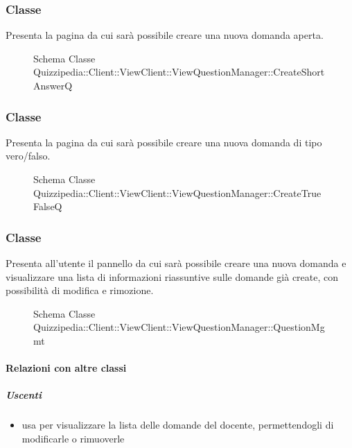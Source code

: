 \subsubsection{Classe }
Presenta la pagina da cui sarà possibile creare una nuova domanda aperta.
\begin{figure}[H]
\centering
\noindent{}
\caption[Schema Classe CreateShortAnswerQ]{Schema Classe Quizzipedia::Client::ViewClient::ViewQuestionManager::CreateShortAnswerQ}
\end{figure}
\subsubsection{Classe }
Presenta la pagina da cui sarà possibile creare una nuova domanda di tipo vero/falso.
\begin{figure}[H]
\centering
\noindent{}
\caption[Schema Classe CreateTrueFalseQ]{Schema Classe Quizzipedia::Client::ViewClient::ViewQuestionManager::CreateTrueFalseQ}
\end{figure}
\subsubsection{Classe }
Presenta all'utente il pannello da cui sarà possibile creare una nuova domanda e visualizzare una lista di informazioni riassuntive sulle domande già create, con possibilità di modifica e rimozione.
\begin{figure}[H]
\centering
\noindent{}
\caption[Schema Classe QuestionMgmt]{Schema Classe Quizzipedia::Client::ViewClient::ViewQuestionManager::QuestionMgmt}
\end{figure}
\paragraph{Relazioni con altre classi}
\subparagraph{Uscenti}
\begin{itemize}
\item usa  per visualizzare la lista delle domande del docente, permettendogli di modificarle o rimuoverle
\end{itemize}
